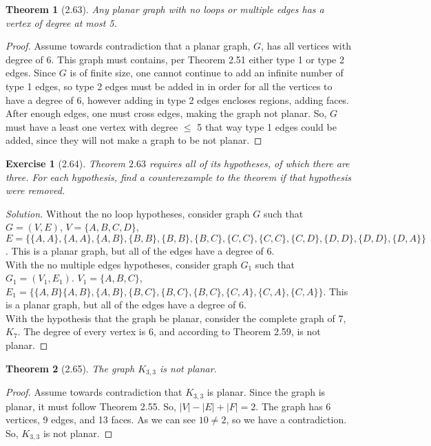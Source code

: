 \documentclass{article}
\newtheorem*{thm}{Theorem}
\newtheorem*{ex}{Exercise}
\newenvironment{solution}
  {\begin{proof}[Solution]}
  {\renewcommand{\qedsymbol}{}\end{proof}}
\begin{document}
\begin{thm}[2.63]
	Any planar graph with no loops or multiple edges has a vertex of degree at most 5.
\end{thm}
\begin{proof}
	Assume towards contradiction that a planar graph, $G$, has all vertices with degree of 6. This graph must contains, per Theorem 2.51 either type 1 or type 2 edges. Since $G$ is of finite size, one cannot
	continue to add an infinite number of type 1 edges, so type 2 edges must be added in in order for all the vertices to have a degree of 6, however adding in type 2 edges encloses regions, adding faces. After enough
	edges, one must cross edges, making the graph not planar. So, $G$ must have a least one vertex with degree $\leq$ 5 that way type 1 edges could be added, since they will not make a graph to be not planar.  
\end{proof}

\begin{ex}[2.64]
	Theorem $2.63$ requires all of its hypotheses, of which there are three. For each hypothesis, find a counterexample to the theorem if that hypothesis were removed.
\end{ex}
\begin{solution}
	Without the no loop hypotheses, consider graph $G$ such that $G = (V,E)$, $V=\{A,B,C,D\}$, \\ 
	$E = \{ \{A,A\}, \{A,A\}, \{A,B\}, \{B,B\}, \{B,B\}, \{B,C\}, \{C,C\}, \{C,C\}, \{C,D\}, \{D,D\}, \{D,D\}, \{D,A\} \}$. 
	This is a planar graph, but all of the edges have a degree of 6. \\
	With the no multiple edges hypotheses, consider graph $G_1$ such that $G_1 = (V_1,E_1)$. $V_1=\{A,B,C\}$, $E_1=\{ \{A,B\} \{A,B\}, \{A,B\}, \{B,C\}, \{B,C\}, \{B,C\}, \{C,A\}, \{C,A\}, \{C,A\} \}$. This is a planar graph,
	but all of the edges have a degree of 6. \\
	With the hypothesis that the graph be planar, consider the complete graph of 7, $K_7$. The degree of every vertex is 6, and according to Theorem 2.59, is not planar. 
\end{solution}

\begin{thm}[2.65]
	The graph $K_{3,3}$ is not planar.
\end{thm}
\begin{proof}
	Assume towards contradiction that $K_{3,3}$ is planar. Since the graph is planar, it must follow Theorem 2.55. So, $|V| - |E| + |F| = 2$. The graph has 6 vertices, 9 edges, and 13 faces. As we can see $10 \ne 2$, so we have 
	a contradiction. So, $K_{3,3}$ is not planar.
\end{proof}
\end{document}
